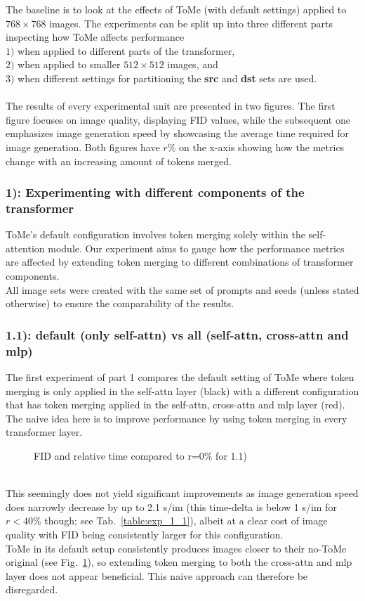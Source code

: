 The baseline is to look at the effects of ToMe (with default settings) applied to $768 \times 768$ images. The experiments can be split up into three different parts inspecting how ToMe affects performance\\ \(1)\) when applied to different parts of the transformer,\\ \(2)\) when applied to smaller $512 \times 512$ images, and\\ \(3)\) when different settings for partitioning the \textbf{src} and \textbf{dst} sets are used.\\
\\
The results of every experimental unit are presented in two figures. The first figure focuses on image quality, displaying FID values, while the subsequent one emphasizes image generation speed by showcasing the average time required for image generation.
Both figures have \(r\%\) on the x-axis showing how the metrics change with an increasing amount of tokens merged.

\subsubsection*{1): Experimenting with different components of the transformer}
ToMe's default configuration involves token merging solely within the self-attention module.
Our experiment aims to gauge how the performance metrics are affected by extending token merging to different combinations of transformer components.\\
All image sets were created with the same set of prompts and seeds (unless stated otherwise) to ensure the comparability of the results.



\subsubsection*{1.1): default (only self-attn) vs all (self-attn, cross-attn and mlp)}
The first experiment of part 1 compares the default setting of ToMe where token merging is only applied in the self-attn layer (black) with a different configuration that has token merging applied in the self-attn, cross-attn and mlp layer (red). 
The naive idea here is to improve performance by using token merging in every transformer layer.
\begin{figure}[!htb]
\label{fig:exp_1_1}
   
   
\caption{FID and relative time compared to r=0\% for 1.1)}
\label{fig:exp_1_1}
\end{figure}\\
This seemingly does not yield significant improvements as image generation speed does narrowly decrease by up to 2.1 s/im (this time-delta is below 1 s/im for $r<40\%$ though; see Tab.~\ref{table:exp_1_1}), albeit at a clear cost of image quality with FID being consistently larger for this configuration. \\
ToMe in its default setup consistently produces images closer to their no-ToMe original (see Fig.~\ref{fig:exp_1_1}), so extending token merging to both the cross-attn and mlp layer does not appear beneficial. This naive approach can therefore be disregarded.



